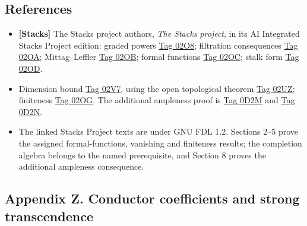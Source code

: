 \documentclass[11pt]{article}
\providecommand{\tightlist}{\setlength{\itemsep}{0pt}\setlength{\parskip}{0pt}}
\begin{document}
\subsection{References}\label{references}

\begin{itemize}
\tightlist
\item
  \textbf{{[}Stacks{]}} The Stacks project authors, \emph{The Stacks
  project}, in its AI Integrated Stacks Project edition: graded powers
  \href{https://kokunoyumeto.github.io/stacks-zh-hans-cn/en/coherent.html\#coherent-lemma-cohomology-powers-ideal-times-F}{Tag
  02O8}; filtration consequences
  \href{https://kokunoyumeto.github.io/stacks-zh-hans-cn/en/coherent.html\#coherent-lemma-cohomology-powers-ideal-application}{Tag
  02OA}; Mittag--Leffler
  \href{https://kokunoyumeto.github.io/stacks-zh-hans-cn/en/coherent.html\#coherent-lemma-ML-cohomology-powers-ideal}{Tag
  02OB}; formal functions
  \href{https://kokunoyumeto.github.io/stacks-zh-hans-cn/en/coherent.html\#coherent-theorem-formal-functions}{Tag
  02OC}; stalk form
  \href{https://kokunoyumeto.github.io/stacks-zh-hans-cn/en/coherent.html\#coherent-lemma-formal-functions-stalk}{Tag
  02OD}.
\item
  Dimension bound
  \href{https://kokunoyumeto.github.io/stacks-zh-hans-cn/en/coherent.html\#coherent-lemma-higher-direct-images-zero-above-dimension-fibre}{Tag
  02V7}, using the open topological theorem
  \href{https://kokunoyumeto.github.io/stacks-zh-hans-cn/en/cohomology.html\#cohomology-proposition-vanishing-Noetherian}{Tag
  02UZ}; finiteness
  \href{https://kokunoyumeto.github.io/stacks-zh-hans-cn/en/coherent.html\#coherent-lemma-characterize-finite}{Tag
  02OG}. The additional ampleness proof is
  \href{https://kokunoyumeto.github.io/stacks-zh-hans-cn/en/coherent.html\#coherent-lemma-ample-on-fibre}{Tag
  0D2M} and
  \href{https://kokunoyumeto.github.io/stacks-zh-hans-cn/en/coherent.html\#coherent-lemma-ample-in-neighbourhood}{Tag
  0D2N}.
\item
  The linked Stacks Project texts are under GNU FDL 1.2. Sections 2--5
  prove the assigned formal-functions, vanishing and finiteness results;
  the completion algebra belongs to the named prerequisite, and Section
  8 proves the additional ampleness consequence.
\end{itemize}

\subsection{Appendix Z. Conductor coefficients and strong
transcendence}\label{appendix-z.-conductor-coefficients-and-strong-transcendence}
\end{document}
